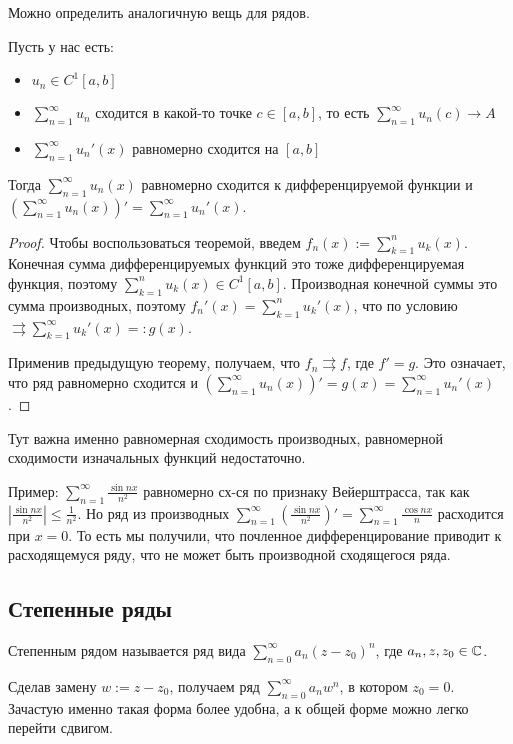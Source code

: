 \vspace*{7mm}

Можно определить аналогичную вещь для рядов.

\begin{follow}
    Пусть у нас есть: \begin{itemize}
        \item $u_n \in C^1[a, b]$
        \item $\sum\limits_{n=1}^\infty u_n$ сходится в какой-то точке $c \in [a, b]$, то есть $\sum\limits_{n=1}^\infty u_n(c) \to A$
        \item $\sum\limits_{n=1}^\infty u_n'(x)$ равномерно сходится на $[a, b]$
    \end{itemize}
    Тогда $\sum\limits_{n=1}^\infty u_n(x)$ равномерно сходится к дифференцируемой функции и $\left(\sum\limits_{n=1}^\infty u_n(x)\right)' = \sum\limits_{n=1}^\infty u_n'(x)$. 
\end{follow}
\begin{proof}
    Чтобы воспользоваться теоремой, введем $f_n(x) := \sum\limits_{k=1}^n u_k(x)$. 
    Конечная сумма дифференцируемых функций это тоже дифференцируемая функция, поэтому $\sum\limits_{k=1}^n u_k(x) \in C^1[a, b]$. 
    Производная конечной суммы это сумма производных, поэтому $f_n'(x) = \sum\limits_{k=1}^n u_k'(x)$, что по условию $\rightrightarrows \sum\limits_{k=1}^\infty u_k'(x) =: g(x)$.

    \quad Применив предыдущую теорему, получаем, что $f_n \rightrightarrows f$, где $f' = g$. Это означает, что ряд равномерно сходится и $\left(\sum\limits_{n=1}^\infty u_n(x)\right)' = g(x) = \sum\limits_{n=1}^\infty u_n'(x)$.
\end{proof}

\begin{notice}
    Тут важна именно равномерная сходимость производных, равномерной сходимости изначальных функций недостаточно.

    \quad Пример: $\sum\limits_{n=1}^\infty \frac{\sin nx}{n^2}$ равномерно сх-ся по признаку Вейерштрасса, так как $|\frac{\sin nx}{n^2}| \leqslant \frac{1}{n^2}$.
    Но ряд из производных $\sum\limits_{n=1}^\infty (\frac{\sin nx}{n^2})' = \sum\limits_{n=1}^\infty \frac{\cos nx}{n}$ расходится при $x = 0$. 
    То есть мы получили, что почленное дифференцирование приводит к расходящемуся ряду, что не может быть производной сходящегося ряда.
\end{notice}

\subsection{Степенные ряды}
\begin{conj}
    Степенным рядом называется ряд вида $\sum\limits_{n=0}^\infty a_n(z - z_0)^n$, где $a_n, z, z_0 \in \mathbb{C}$.
\end{conj}
\begin{notice}
    Сделав замену $w := z - z_0$, получаем ряд $\sum\limits_{n=0}^\infty a_n w^n$, в котором $z_0 = 0$. 
    Зачастую именно такая форма более удобна, а к общей форме можно легко перейти сдвигом.
\end{notice}

